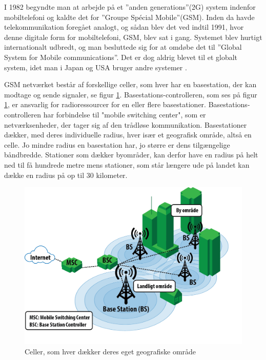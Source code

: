 I 1982 begyndte man at arbejde på et ”anden generations”(2G) system indenfor mobiltelefoni og kaldte det for ”Groupe Spécial Mobile”(GSM). Inden da havde telekommunikation foregået analogt, og sådan blev det ved indtil 1991, hvor denne digitale form for mobiltelefoni, GSM, blev sat i gang. Systemet blev hurtigt internationalt udbredt, og man besluttede sig for at omdøbe det til ”Global System for Mobile communications”. Det er dog aldrig blevet til et globalt system, idet man i Japan og USA bruger andre systemer \cite{denstoredanske}.

GSM netværket består af forskellige celler, som hver har en basestation, der kan modtage og sende signaler, se figur \ref{celler}. Basestations-controlleren, som ses på figur \ref{celler}, er ansvarlig for radioressourcer for en eller flere basestationer. Basestations-controlleren har forbindelse til "mobile switching center", som er netværksenheder, der tager sig af den trådløse kommunikation. Basestationer dækker, med deres individuelle radius, hver især et geografisk område, altså en celle. Jo mindre radius en basestation har, jo større er dens tilgængelige båndbredde. Stationer som dækker byområder, kan derfor have en radius på helt ned til få hundrede metre mens stationer, som står længere ude på landet kan dække en radius på op til 30 kilometer. \cite{techviral}

\begin{figure}[H]
\centering
\includegraphics []{Billeder/celler.png}
\caption {Celler, som hver dækker deres eget geografiske område \cite{techviral}}
\label {celler}
\end{figure} 

